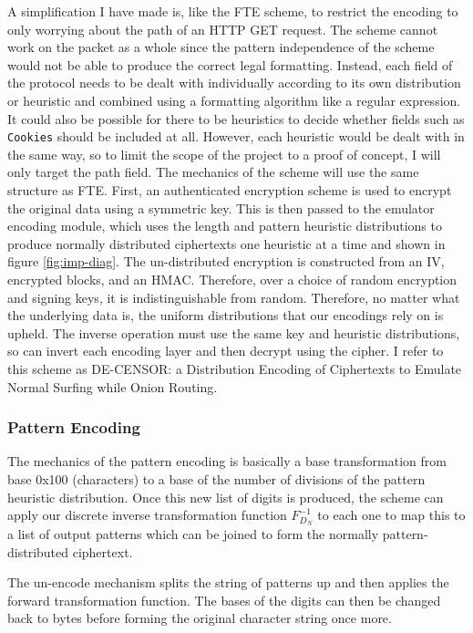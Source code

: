 \documentclass[ %
                    author={Samuel Russell},
                supervisor={Prof. Bogdan Warinschi},
                    degree={MEng},
                     title={Innocuous Ciphertexts},
                  subtitle={The DE-CENSOR Scheme},
                      type={research},
                      year={2018} ]{dissertation}
\begin{document}
A simplification I have made is, like the FTE scheme, to restrict the encoding to only worrying about the path of an HTTP GET request.
The scheme cannot work on the packet as a whole since the pattern independence of the scheme would not be able to produce the correct legal formatting.
Instead, each field of the protocol needs to be dealt with individually according to its own distribution or heuristic and combined using a formatting algorithm like a regular expression.
It could also be possible for there to be heuristics to decide whether fields such as \texttt{Cookies} should be included at all.
However, each heuristic would be dealt with in the same way, so to limit the scope of the project to a proof of concept, I will only target the path field.
The mechanics of the scheme will use the same structure as FTE. First, an authenticated encryption scheme is used to encrypt the original data using a symmetric key.
This is then passed to the emulator encoding module, which uses the length and pattern heuristic distributions to produce normally distributed ciphertexts one heuristic at a time and shown in figure \ref{fig:imp-diag}.
The un-distributed encryption is constructed from an IV, encrypted blocks, and an HMAC. Therefore, over a choice of random encryption and signing keys, it is indistinguishable from random.
Therefore, no matter what the underlying data is, the uniform distributions that our encodings rely on is upheld.
The inverse operation must use the same key and heuristic distributions, so can invert each encoding layer and then decrypt using the cipher.
I refer to this scheme as DE-CENSOR: a Distribution Encoding of Ciphertexts to Emulate Normal Surfing while Onion Routing.

\subsubsection{Pattern Encoding}

The mechanics of the pattern encoding is basically a base transformation from base 0x100 (characters) to a base of the number of divisions of the pattern heuristic distribution.
Once this new list of digits is produced, the scheme can apply our discrete inverse transformation function $F^{-1}_{D_N}$ to each one to map this to a list of output patterns which can be joined to form the normally pattern-distributed ciphertext.

The un-encode mechanism splits the string of patterns up and then applies the forward transformation function. The bases of the digits can then be changed back to bytes before forming the original character string once more.
\end{document}
